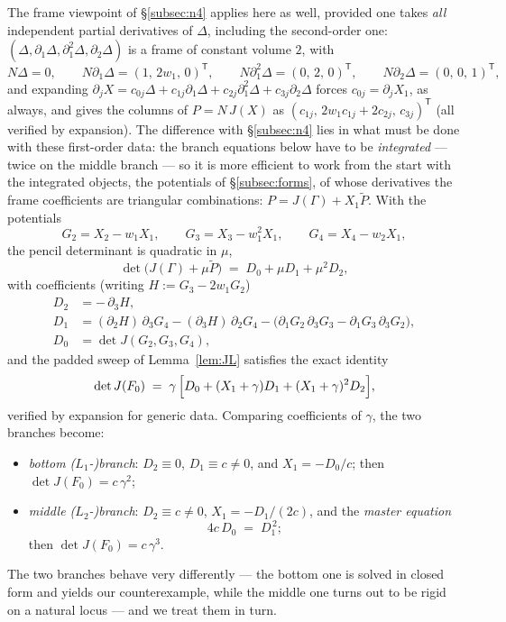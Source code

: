 \documentclass[11pt]{article}
\theoremstyle{plain}
\theoremstyle{definition}
\theoremstyle{remark}
\begin{document}
The frame viewpoint of \S\ref{subsec:n4} applies here as well, provided one
takes \emph{all} independent partial derivatives of $\Delta$, including the
second-order one: $(\Delta,\partial_1\Delta,\partial_1^2\Delta,\partial_2\Delta)$
is a frame of constant volume $2$, with
\[
N\Delta=0,\qquad
N\partial_1\Delta=(1,\,2w_1,\,0)^{\mathsf T},\qquad
N\partial_1^2\Delta=(0,\,2,\,0)^{\mathsf T},\qquad
N\partial_2\Delta=(0,\,0,\,1)^{\mathsf T},
\]
and expanding
$\partial_jX=c_{0j}\Delta+c_{1j}\partial_1\Delta+c_{2j}\partial_1^2\Delta
+c_{3j}\partial_2\Delta$ forces $c_{0j}=\partial_jX_1$, as always, and gives
the columns of $P=N\,J(X)$ as $(c_{1j},\,2w_1c_{1j}+2c_{2j},\,c_{3j})^{\mathsf T}$
(all verified by expansion). The difference with \S\ref{subsec:n4} lies in
what must be done with these first-order data: the branch equations below have
to be \emph{integrated} --- twice on the middle branch --- so it is more
efficient to work from the start with the integrated objects, the potentials
of \S\ref{subsec:forms}, of whose derivatives the frame coefficients are
triangular combinations: $P=J(\Gamma)+X_1\widetilde P$. With the potentials
\[
G_2=X_2-w_1X_1,\qquad G_3=X_3-w_1^2X_1,\qquad G_4=X_4-w_2X_1 ,
\]
the pencil determinant is quadratic in $\mu$,
\[
\det\bigl(J(\Gamma)+\mu\widetilde P\bigr)\;=\;D_0+\mu D_1+\mu^2D_2 ,
\]
with coefficients (writing $H:=G_3-2w_1G_2$)
\begin{align*}
D_2&=-\,\partial_3H,\\
D_1&=(\partial_2H)\,\partial_3G_4-(\partial_3H)\,\partial_2G_4
-\bigl(\partial_1G_2\,\partial_3G_3-\partial_1G_3\,\partial_3G_2\bigr),\\
D_0&=\det J(G_2,G_3,G_4),
\end{align*}
and the padded sweep of Lemma~\ref{lem:JL} satisfies the exact identity
\begin{equation}\label{eq:pencil5}
\det J(F_0)\;=\;\gamma\,\Bigl[D_0+(X_1+\gamma)D_1+(X_1+\gamma)^2D_2\Bigr],
\end{equation}
verified by expansion for generic data. Comparing coefficients of $\gamma$,
the two branches become:
\begin{itemize}
\item \emph{bottom ($L_1$-)branch}: $D_2\equiv0$, $D_1\equiv c\neq0$, and
$X_1=-D_0/c$; then $\det J(F_0)=c\,\gamma^2$;
\item \emph{middle ($L_2$-)branch}: $D_2\equiv c\neq0$, $X_1=-D_1/(2c)$, and
the \emph{master equation}
\begin{equation}\label{eq:master5}
4c\,D_0\;=\;D_1^{\,2} ;
\end{equation}
then $\det J(F_0)=c\,\gamma^3$.
\end{itemize}
The two branches behave very differently --- the bottom one is solved in
closed form and yields our counterexample, while the middle one turns out to
be rigid on a natural locus --- and we treat them in turn.
\end{document}
